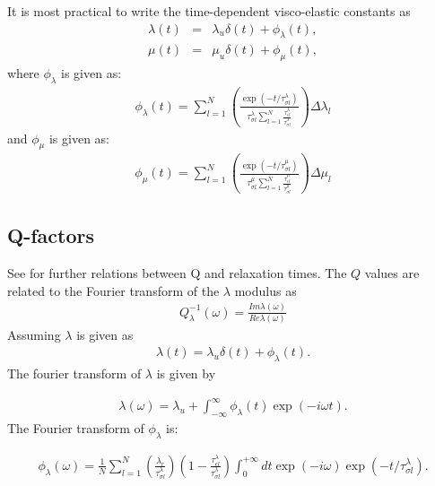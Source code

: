 \documentclass[11pt]{article}
\begin{document}
{It is most practical to write the time-dependent visco-elastic constants as
\begin{eqnarray}
  \lambda(t) & = & \lambda_u \delta(t) + \phi_{\lambda}(t), \\
  \mu(t)    &  =  &\mu_u\delta(t)+\phi_{\mu}(t),
\end{eqnarray}
where
%
$\phi_{\lambda}$ is given as:
\begin{eqnarray}
  \phi_{\lambda}(t) = \sum_{l=1}^N 
  \left(\frac{\exp(-t/\tau^{\lambda}_{\sigma l})}{\tau^{\lambda}_{\sigma l}\sum_{l=1}^N \frac{\tau^{\lambda}_{\epsilon l}}{\tau^{\lambda}_{\sigma l}}}\right)
            \Delta \lambda_l
\end{eqnarray}
%
and $\phi_{\mu}$ is given as:
\begin{eqnarray}
  \phi_{\mu}(t) = \sum_{l=1}^N 
  \left(\frac{\exp(-t/\tau^{\mu}_{\sigma l})}{\tau^{\mu}_{\sigma l}\sum_{l=1}^N \frac{\tau^{\mu}_{\epsilon l}}{\tau^{\mu}_{\sigma l}}}\right)
            \Delta \mu_l
\end{eqnarray}
\subsection*{Q-factors}
See \cite{Casula1992} for further relations between Q and relaxation times.
The $Q$ values are related to the Fourier transform of the $\lambda$ modulus as
\begin{eqnarray}
  Q^{-1}_{\lambda}(\omega) = \frac{Im \lambda(\omega)}{Re \lambda(\omega)}
\end{eqnarray}
Assuming $\lambda$ is given as
\begin{eqnarray}
\lambda(t) = \lambda_u\delta(t) + \phi_{\lambda}(t).
\end{eqnarray}
The fourier transform of $\lambda$ is given by

\begin{eqnarray}
\lambda(\omega) = \lambda_u + \int_{-\infty}^{\infty} \phi_{\lambda}(t) \exp(-i\omega t).
\end{eqnarray}
The Fourier transform of $\phi_\lambda$ is:

\begin{eqnarray}
\phi_{\lambda}(\omega)=  \frac{1}{N}\sum_{l=1}^N\left(\frac{\lambda_r}{\tau^{\lambda}_{\sigma l}}\right) 
            \left(1-\frac{\tau^{\lambda}_{\epsilon l}}{\tau^{\lambda}_{\sigma l}}\right)
           \int^{+\infty}_0 dt\exp(-i\omega)\exp(-t/\tau^{\lambda}_{\sigma l}).
\end{eqnarray}

}
\end{document}
